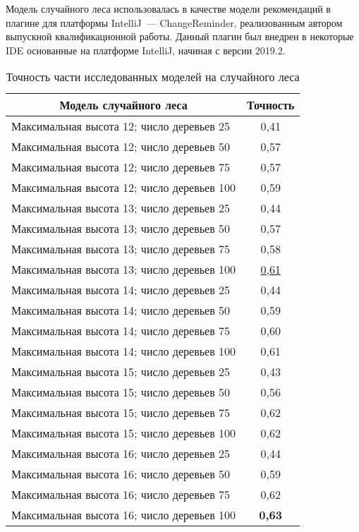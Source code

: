Модель случайного леса использовалась в качестве модели рекомендаций в плагине для платформы IntelliJ~--- ChangeReminder, реализованным автором выпускной квалификационной работы. Данный плагин был внедрен в некоторые IDE основанные на платформе IntelliJ, начиная с версии 2019.2.
        \begin{table}[!h]
        \caption{Точность части исследованных моделей на случайного леса}\label{rf-offline-result-table}
        \centering
        \begin{tabular}{|l|c|}\hline
        \multicolumn{1}{|c|}{\textbf{Модель случайного леса}} & \textbf{Точность}\\\hline
        Максимальная высота 12; число деревьев 25 & 0,41\\\hline
        Максимальная высота 12; число деревьев 50 & 0,57\\\hline
        Максимальная высота 12; число деревьев 75 & 0,57\\\hline
        Максимальная высота 12; число деревьев 100 & 0,59\\\hline
        Максимальная высота 13; число деревьев 25 & 0,44\\\hline
        Максимальная высота 13; число деревьев 50 & 0,57\\\hline
        Максимальная высота 13; число деревьев 75 & 0,58\\\hline
        Максимальная высота 13; число деревьев 100 & \uline{0,61}\\\hline
        Максимальная высота 14; число деревьев 25 & 0,44\\\hline
        Максимальная высота 14; число деревьев 50 & 0,59\\\hline
        Максимальная высота 14; число деревьев 75 & 0,60\\\hline
        Максимальная высота 14; число деревьев 100 & 0,61\\\hline
        Максимальная высота 15; число деревьев 25 & 0,43\\\hline
        Максимальная высота 15; число деревьев 50 & 0,56\\\hline
        Максимальная высота 15; число деревьев 75 & 0,62\\\hline
        Максимальная высота 15; число деревьев 100 & 0,62\\\hline
        Максимальная высота 16; число деревьев 25 & 0,44\\\hline
        Максимальная высота 16; число деревьев 50 & 0,59\\\hline
        Максимальная высота 16; число деревьев 75 & 0,62\\\hline
        Максимальная высота 16; число деревьев 100 & \textbf{0,63}\\\hline
        \end{tabular}
        \end{table}

